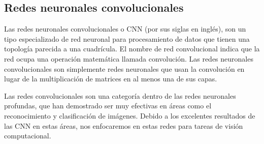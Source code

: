 


\subsection{Redes neuronales convolucionales}

\begin{remark}
Las redes neuronales convolucionales o CNN (por sus siglas en inglés), son un tipo especializado
de red neuronal para procesamiento de datos que tienen una topología parecida a una cuadrícula. El nombre de 
red convolucional indica que la red ocupa una operación matemática llamada convolución. Las redes 
neuronales
convolucionales son simplemente redes neuronales que usan la convolución en lugar de la multiplicación de 
matrices en al menos una de sus capas.
\end{remark}


Las redes convolucionales son una categoría dentro de las redes neuronales profundas, que han 
demostrado ser muy efectivas en áreas como el reconocimiento y clasificación de imágenes. Debido
a los excelentes resultados de las CNN en estas áreas, nos enfocaremos en estas redes para tareas
de visión computacional.\\

